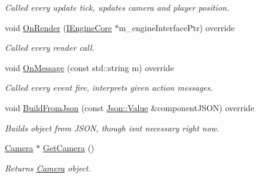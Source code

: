 \begin{DoxyCompactItemize}
\begin{DoxyCompactList}\small\item\em Called every update tick, updates camera and player position. \end{DoxyCompactList}\item 
\mbox{\label{class_player_component_a09993dd0dc2edea3fccc08ec7d6a1d56}} 
void \mbox{\hyperlink{class_player_component_a09993dd0dc2edea3fccc08ec7d6a1d56}{On\+Render}} (\mbox{\hyperlink{class_i_engine_core}{I\+Engine\+Core}} $\ast$m\+\_\+engine\+Interface\+Ptr) override
\begin{DoxyCompactList}\small\item\em Called every render call. \end{DoxyCompactList}\item 
\mbox{\label{class_player_component_abf177968c3355b3152eed62879a6cfe6}} 
void \mbox{\hyperlink{class_player_component_abf177968c3355b3152eed62879a6cfe6}{On\+Message}} (const std\+::string m) override
\begin{DoxyCompactList}\small\item\em Called every event fire, interprets given action messages. \end{DoxyCompactList}\item 
\mbox{\label{class_player_component_a683e8e6b11f8b26568d8c2c8f77fc4a6}} 
void \mbox{\hyperlink{class_player_component_a683e8e6b11f8b26568d8c2c8f77fc4a6}{Build\+From\+Json}} (const \mbox{\hyperlink{class_json_1_1_value}{Json\+::\+Value}} \&component\+J\+S\+ON) override
\begin{DoxyCompactList}\small\item\em Builds object from J\+S\+ON, though isn\textquotesingle{}t necessary right now. \end{DoxyCompactList}\item 
\mbox{\label{class_player_component_ac69d2de4717b93332bd3e52fac29eab7}} 
\mbox{\hyperlink{class_camera}{Camera}} $\ast$ \mbox{\hyperlink{class_player_component_ac69d2de4717b93332bd3e52fac29eab7}{Get\+Camera}} ()
\begin{DoxyCompactList}\small\item\em Returns \mbox{\hyperlink{class_camera}{Camera}} object. \end{DoxyCompactList}\end{DoxyCompactItemize}
